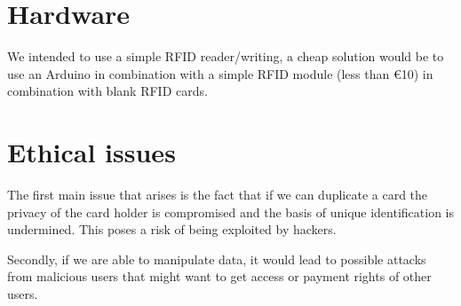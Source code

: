 \documentclass[11pt]{article}
\begin{document}
\clearpage

\section{Hardware}
We intended to use a simple RFID reader/writing, a cheap solution would be to use an Arduino in combination with a simple RFID module (less than \euro{10}) in combination with blank RFID cards. 

\section{Ethical issues}
The first main issue that arises is the fact that if we can duplicate a card the privacy of the card holder is compromised and the basis of unique identification is undermined. This poses a risk of being exploited by hackers.

Secondly, if we are able to manipulate data, it would lead to possible attacks from malicious users that might want to get access or payment rights of other users.



\end{document}
